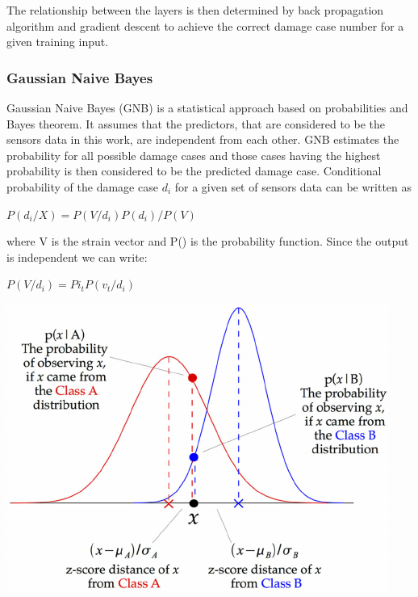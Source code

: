 \documentclass{article}
\begin{document}
The relationship between the layers is then determined by back propagation algorithm and gradient descent to achieve the correct damage case number for a given training input.

\subsubsection{Gaussian Naive Bayes}
Gaussian Naive Bayes (GNB) is a statistical approach based on probabilities and Bayes theorem. It assumes that the predictors, that are considered to be the sensors data in this work, are independent from each other. GNB estimates the probability for all possible damage cases and those cases having the highest probability is then considered to be the predicted damage case. Conditional probability of the damage case $d_i$ for a given set of sensors data can be written as 

\begin{center}
    $P(d_{i}/X) =  P(V/d_{i})P(d_{i})/P(V)$
\end{center}

where V is the strain vector and P() is the probability function. Since the output is independent we can write:

\begin{center}
    $P(V/d_{i}) = Pi_{t} P(v_{t}/d_{i})$
\end{center}


\begin{center}
    \includegraphics[scale=0.5]{Images/GNB.png}
    
\end{center}
\end{document}
